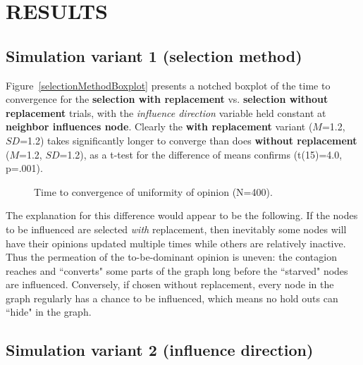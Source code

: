 
\section{RESULTS}

\subsection{Simulation variant 1 (selection method)}

Figure~\ref{selectionMethodBoxplot} presents a notched boxplot of the time to
convergence for the \textbf{selection with replacement} vs. \textbf{selection
without replacement} trials, with the \textsl{influence direction} variable
held constant at \textbf{neighbor influences node}. Clearly the \textbf{with
replacement} variant ($M$=1.2, $SD$=1.2) takes significantly longer to
converge than does \textbf{without replacement} ($M$=1.2, $SD$=1.2), as a
t-test for the difference of means confirms (t(15)=4.0, p=.001).

\begin{figure}[!tbp]
  \centering
  \hfill
  \caption{Time to convergence of uniformity of opinion (N=400).}
\end{figure}


The explanation for this difference would appear to be the following. If the
nodes to be influenced are selected \textit{with} replacement, then inevitably
some nodes will have their opinions updated multiple times while others are
relatively inactive. Thus the permeation of the to-be-dominant opinion is
uneven: the contagion reaches and ``converts" some parts of the graph long
before the ``starved" nodes are influenced. Conversely, if chosen without
replacement, every node in the graph regularly has a chance to be influenced,
which means no hold outs can ``hide" in the graph.





\subsection{Simulation variant 2 (influence direction)}

